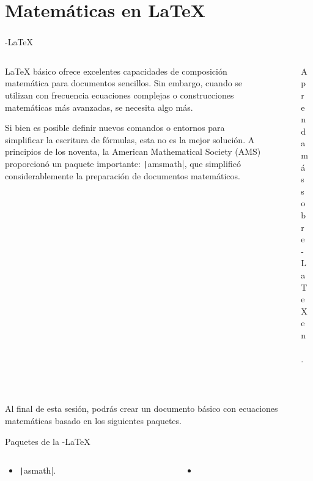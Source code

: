 \section{Matemáticas en \LaTeX}

\begin{frame}
	\frametitle{\secname}

	\begin{block}{\AmS-\LaTeX}
		\begin{columns}
			\begin{column}{.65\paperwidth}
				\LaTeX{} básico ofrece excelentes capacidades de composición
				matemática para documentos sencillos.
				Sin embargo, cuando se utilizan con frecuencia ecuaciones complejas
				o construcciones matemáticas más avanzadas, se necesita algo más.

				Si bien es posible definir nuevos comandos o entornos para
				simplificar la escritura de fórmulas, esta no es la mejor solución.
				A principios de los noventa, la
				\alert{American Mathematical Society (AMS)} proporcionó un
				paquete importante: \texttt|amsmath|, que
				simplificó considerablemente la preparación de documentos
				matemáticos.
			\end{column}
			\begin{column}{.25\paperwidth}
				\begin{figure}[ht!]
					\centering
					
					\caption{Aprenda más sobre \AmS-\LaTeX{} en~\cite{AMS2025}.}
				\end{figure}
			\end{column}
		\end{columns}
	\end{block}

	\

	Al final de esta sesión, podrás crear un documento básico con
	ecuaciones matemáticas basado en los siguientes paquetes.
	\begin{block}{Paquetes de la \AmS-\LaTeX}
		\vspace*{-\baselineskip}\setlength\belowdisplayshortskip{0pt}
		\begin{columns}
			\begin{column}{.2\paperwidth}
				\begin{itemize}
					\item

					      \texttt|asmath|.
				\end{itemize}
			\end{column}
			\begin{column}{.2\paperwidth}
				\begin{itemize}
					\item


\end{itemize}
\end{column}
\end{columns}
\end{block}
\end{frame}
